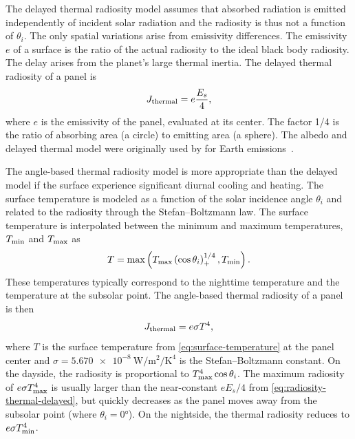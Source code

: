 The delayed thermal radiosity model assumes that absorbed radiation is emitted independently of incident solar radiation and the radiosity is thus not a function of $\theta_i$. The only spatial variations arise from emissivity differences. The emissivity $e$ of a surface is the ratio of the actual radiosity to the ideal black body radiosity. The delay arises from the planet's large thermal inertia. The delayed thermal radiosity of a panel is~\cite{Knocke1988}
\begin{align}
    \label{eq:radiosity-thermal-delayed}
    J_\textnormal{thermal} = e \frac{E_s}{4},
\end{align}
where $e$ is the emissivity of the panel, evaluated at its center. The factor 1/4 is the ratio of absorbing area (a circle) to emitting area (a sphere). The albedo and delayed thermal model were originally used by \citeauthor{Knocke1988} for Earth emissions~\cite{Knocke1988}.

The angle-based thermal radiosity model is more appropriate than the delayed model if the surface experience significant diurnal cooling and heating. The surface temperature is modeled as a function of the solar incidence angle $\theta_i$ and related to the radiosity through the Stefan--Boltzmann law. The surface temperature is interpolated between the minimum and maximum temperatures, $T_\textnormal{min}$ and $T_\textnormal{max}$ as
\begin{align}
    \label{eq:surface-temperature}
    T = \max\left( T_\textnormal{max} \left(\cos\theta_i\right)_+^{1/4}, T_\textnormal{min} \right).
\end{align}
These temperatures typically correspond to the nighttime temperature and the temperature at the subsolar point. The angle-based thermal radiosity of a panel is then~\cite{Lemoine2013}
\begin{align}
    \label{eq:radiosity-thermal-anglebased}
    J_\textnormal{thermal} = e \sigma T^4,
\end{align}
where $T$ is the surface temperature from \cref{eq:surface-temperature} at the panel center and $\sigma = \qty{5.670e-8}{\W\per\m\squared\per\K\tothe{4}}$ is the Stefan--Boltzmann constant. On the dayside, the radiosity is proportional to $T_\textnormal{max}^4\cos\theta_i$. The maximum radiosity of $e \sigma T_\textnormal{max}^4$ is usually larger than the near-constant $e E_s/4$ from \cref{eq:radiosity-thermal-delayed}, but quickly decreases as the panel moves away from the subsolar point (where $\theta_i = \ang{0}$). On the nightside, the thermal radiosity reduces to $e \sigma T_\textnormal{min}^4$.

